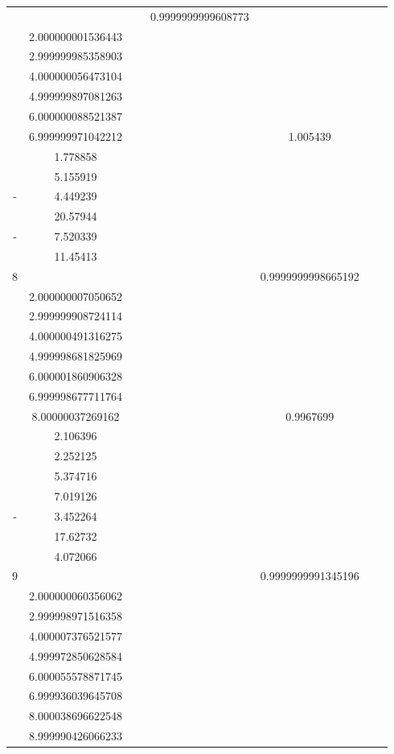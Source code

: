 \documentclass[oneside, final, 12pt]{extarticle}
\begin{document}
\begin{longtable}{|c|c|c|c|c|c|c|}
& ~ 
& \( \begin{aligned}
& 0.9999999999608773 \\ & 2.000000001536443 \\ & 2.999999985358903 \\ & 4.000000056473104 \\ & 4.999999897081263 \\ & 6.000000088521387 \\ & 6.999999971042212 
\end{aligned} \)
& ~ 
& \( \begin{aligned}
& 1.005439 \\ & 1.778858 \\ & 5.155919 \\ -& 4.449239 \\ & 20.57944 \\ -& 7.520339 \\ & 11.45413 
\end{aligned} \)
& ~ 
\\ \hline
\(8\) & \( \begin{aligned}
\end{aligned} \)
& ~ 
& \( \begin{aligned}
& 0.9999999998665192 \\ & 2.000000007050652 \\ & 2.999999908724114 \\ & 4.000000491316275 \\ & 4.999998681825969 \\ & 6.000001860906328 \\ & 6.999998677711764 \\ & 8.00000037269162 
\end{aligned} \)
& ~ 
& \( \begin{aligned}
& 0.9967699 \\ & 2.106396 \\ & 2.252125 \\ & 5.374716 \\ & 7.019126 \\ -& 3.452264 \\ & 17.62732 \\ & 4.072066 
\end{aligned} \)
& ~ 
\\ \hline
\(9\) & \( \begin{aligned}
\end{aligned} \)
& ~ 
& \( \begin{aligned}
& 0.9999999991345196 \\ & 2.000000060356062 \\ & 2.999998971516358 \\ & 4.000007376521577 \\ & 4.999972850628584 \\ & 6.000055578871745 \\ & 6.999936039645708 \\ & 8.000038696622548 \\ & 8.999990426066233 

\end{aligned}
\end{longtable}
\end{document}
